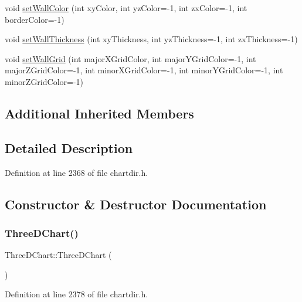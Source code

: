 \begin{DoxyCompactItemize}
\item 
void \hyperlink{class_three_d_chart_ab1b2d0127a2398c5c2a68d85e18a1f4a}{set\+Wall\+Color} (int xy\+Color, int yz\+Color=-\/1, int zx\+Color=-\/1, int border\+Color=-\/1)
\item 
void \hyperlink{class_three_d_chart_a13b070b549798dae6ba2420cc1d398f8}{set\+Wall\+Thickness} (int xy\+Thickness, int yz\+Thickness=-\/1, int zx\+Thickness=-\/1)
\item 
void \hyperlink{class_three_d_chart_a5a057339c27b9faa0d46f07666f5b0e7}{set\+Wall\+Grid} (int major\+X\+Grid\+Color, int major\+Y\+Grid\+Color=-\/1, int major\+Z\+Grid\+Color=-\/1, int minor\+X\+Grid\+Color=-\/1, int minor\+Y\+Grid\+Color=-\/1, int minor\+Z\+Grid\+Color=-\/1)
\end{DoxyCompactItemize}
\subsection*{Additional Inherited Members}


\subsection{Detailed Description}


Definition at line 2368 of file chartdir.\+h.



\subsection{Constructor \& Destructor Documentation}
\mbox{\label{class_three_d_chart_a19702e8a6eec6ba90e015a07b5ea4a01}} 
\subsubsection{\texorpdfstring{Three\+D\+Chart()}{ThreeDChart()}}
{\footnotesize\ttfamily Three\+D\+Chart\+::\+Three\+D\+Chart (\begin{DoxyParamCaption}{ }\end{DoxyParamCaption})\hspace{0.3cm}{\ttfamily [inline]}}



Definition at line 2378 of file chartdir.\+h.



